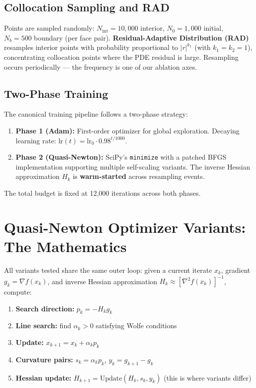 \documentclass[11pt,a4paper]{article}
\newcommand{\Hk}{H_k}
\newcommand{\Hkp}{H_{k+1}}
\newcommand{\sk}{s_k}
\newcommand{\yk}{y_k}
\newcommand{\gk}{g_k}
\newcommand{\xk}{x_k}
\begin{document}
\subsection{Collocation Sampling and RAD}

Points are sampled randomly:
$N_{\text{int}} = 10{,}000$ interior, $N_0 = 1{,}000$ initial,
$N_b = 500$ boundary (per face pair).  \textbf{Residual-Adaptive
Distribution (RAD)} resamples interior points with probability
proportional to $|r|^{k_1}$ (with $k_1 = k_2 = 1$), concentrating
collocation points where the PDE residual is large.  Resampling
occurs periodically --- the frequency is one of our ablation axes.

\subsection{Two-Phase Training}

The canonical training pipeline follows a two-phase strategy:
\begin{enumerate}[nosep]
  \item \textbf{Phase 1 (Adam):} First-order optimizer for global
        exploration.  Decaying learning rate:
        $\text{lr}(t) = \text{lr}_0 \cdot 0.98^{t/1000}$.
  \item \textbf{Phase 2 (Quasi-Newton):} SciPy's \texttt{minimize}
        with a patched BFGS implementation supporting multiple
        self-scaling variants.  The inverse Hessian approximation $H_k$
        is \textbf{warm-started} across resampling events.
\end{enumerate}
The total budget is fixed at 12,000 iterations across both phases.


\section{Quasi-Newton Optimizer Variants: The Mathematics}
\label{sec:optimizers}

All variants tested share the same outer loop: given a current iterate
$\xk$, gradient $\gk = \nabla f(\xk)$, and inverse Hessian approximation
$\Hk \approx [\nabla^2 f(\xk)]^{-1}$, compute:
\begin{enumerate}[nosep]
  \item \textbf{Search direction:} $p_k = -\Hk \gk$
  \item \textbf{Line search:} find $\alpha_k > 0$ satisfying Wolfe conditions
  \item \textbf{Update:} $x_{k+1} = \xk + \alpha_k p_k$
  \item \textbf{Curvature pairs:} $\sk = \alpha_k p_k$, $\yk = g_{k+1} - \gk$
  \item \textbf{Hessian update:} $\Hkp = \text{Update}(\Hk, \sk, \yk)$
        \quad (this is where variants differ)
\end{enumerate}
\end{document}
